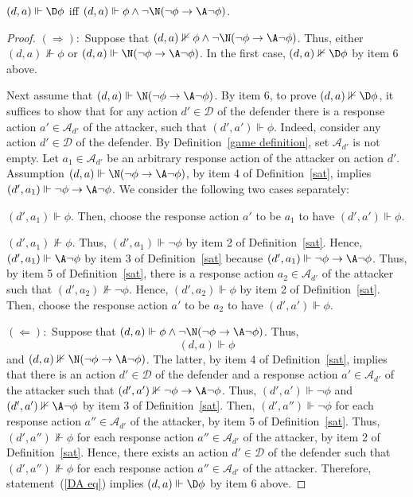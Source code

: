\documentclass[letterpaper]{article}
\begin{document}
\begin{lemma}\label{D through A lemma}
$(d,a)\Vdash \D\phi$ iff  $(d,a)\Vdash \phi\wedge \neg\N(\neg\phi\to\A\neg\phi)$.
\end{lemma}
\begin{proof}
$(\Rightarrow):$ Suppose that $(d,a)\nVdash \phi\wedge \neg\N(\neg\phi\to\A\neg\phi)$. Thus, either $(d,a)\nVdash \phi$ or $(d,a) \Vdash\N(\neg\phi\to\A\neg\phi)$. In the first case, $(d,a)\nVdash\D\phi$ by item 6 above.

Next assume that $(d,a) \Vdash\N(\neg\phi\to\A\neg\phi)$. By item 6, to prove $(d,a)\nVdash \D\phi$, it suffices to show that for any action $d'\in\mathcal{D}$ of the defender there is a response action $a'\in\mathcal{A}_{d'}$ of the attacker, such that $(d',a')\Vdash\phi$. Indeed, consider any action $d'\in\mathcal{D}$ of the defender. By Definition~\ref{game definition}, set $\mathcal{A}_{d'}$ is not empty. Let $a_1\in \mathcal{A}_{d'}$ be an arbitrary response action of the attacker  on action $d'$. Assumption $(d,a) \Vdash\N(\neg\phi\to\A\neg\phi)$, by item 4 of Definition~\ref{sat}, implies $(d',a_1)\Vdash\neg\phi\to\A\neg\phi$. We consider the following two cases separately:

 $(d',a_1)\Vdash\phi$. Then, choose the response action $a'$ to be $a_1$ to have $(d',a')\Vdash\phi$.

 $(d',a_1)\nVdash\phi$. Thus, $(d',a_1)\Vdash\neg\phi$ by item 2 of Definition~\ref{sat}. Hence, $(d',a_1)\Vdash\A\neg\phi$ by item 3 of Definition~\ref{sat} because $(d',a_1)\Vdash\neg\phi\to\A\neg\phi$. Thus, by item 5 of Definition~\ref{sat}, there is a response action $a_2\in\mathcal{A}_{d'}$ of the attacker such that $(d',a_2)\nVdash\neg\phi$. Hence, $(d',a_2)\Vdash\phi$ by item 2 of Definition~\ref{sat}. Then, choose the response action $a'$ to be $a_2$ to have $(d',a')\Vdash\phi$.

\noindent$(\Leftarrow):$ Suppose that $(d,a) \Vdash \phi\wedge \neg\N(\neg\phi\to\A\neg\phi)$. Thus, 
\begin{equation}\label{DA eq}
    (d,a) \Vdash \phi
\end{equation}
and  $(d,a) \nVdash\N(\neg\phi\to\A\neg\phi)$. The latter, by item 4 of Definition~\ref{sat}, implies that there is an action $d'\in\mathcal{D}$ of the defender and a response action $a'\in\mathcal{A}_{d'}$ of the attacker such that $(d',a') \nVdash\neg\phi\to\A\neg\phi$. Thus, $(d',a') \Vdash\neg\phi$ and $(d',a') \nVdash\A\neg\phi$ by item 3 of Definition~\ref{sat}. Then, $(d',a'') \Vdash\neg\phi$ for each response action $a''\in\mathcal{A}_{d'}$ of the attacker, by item 5 of Definition~\ref{sat}. 
Thus, $(d',a'') \nVdash\phi$ for each response action $a''\in\mathcal{A}_{d'}$ of the attacker, by item 2 of Definition~\ref{sat}. 
Hence, there exists an action $d'\in\mathcal{D}$ of the defender such that $(d',a'') \nVdash\phi$ for each response action $a''\in\mathcal{A}_{d'}$ of the attacker.
Therefore, statement~(\ref{DA eq}) implies $(d,a) \Vdash \D\phi$ by item 6 above.
\end{proof}
\end{document}

